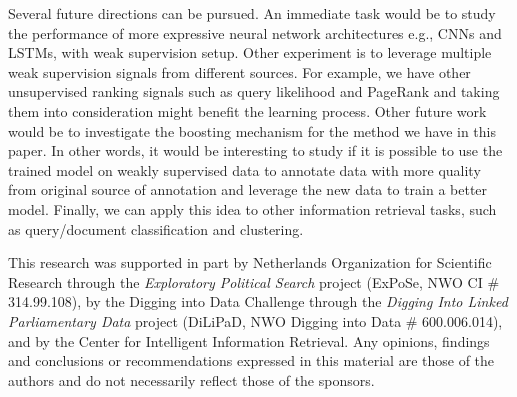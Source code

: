 \documentclass[sigconf]{acmart}
\newcommand{\shrink}{\vspace{-1.5ex}}
\newcommand{\sshrink}{\vspace{-.80ex}}
\newcommand{\mypar}[1]{\vspace*{-0.1ex}\medskip\noindent\textbf{#1}~}
\begin{document}
Several future directions can be pursued. 
%
An immediate task would be to study the performance of more expressive neural network architectures e.g., CNNs and LSTMs, with weak supervision setup.  
%
Other experiment is to leverage multiple weak supervision signals from different sources. For example, we have other unsupervised ranking signals such as query likelihood and PageRank and taking them into consideration might benefit the learning process. 
%
Other future work would be to investigate the boosting mechanism for the method we have in this paper. In other words, it would be interesting to study if it is possible to use the trained model on weakly supervised data to annotate data with more quality from original source of annotation and leverage the new data to train a better model. 
%
Finally, we can apply this idea to other information retrieval tasks, such as query/document classification and clustering.


\shrink
\begin{acks}
This research was supported in part by Netherlands Organization for Scientific Research through the \textsl{Exploratory Political Search} project (ExPoSe, NWO CI \# 314.99.108), by the Digging into Data Challenge through the \textsl{Digging Into Linked Parliamentary Data} project (DiLiPaD, NWO Digging into Data \# 600.006.014), and by the Center for Intelligent Information Retrieval. Any opinions, findings and conclusions or recommendations expressed in this material are those of the authors and do not necessarily reflect those of the sponsors.
\end{acks}

\sshrink

 
\end{document}
